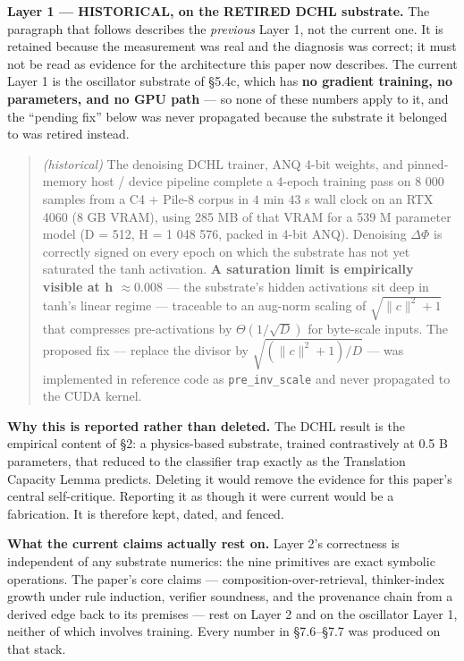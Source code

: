 \documentclass[
  11pt,
  a4paper,
]{article}
\begin{document}
\textbf{Layer 1 --- HISTORICAL, on the RETIRED DCHL substrate.} The
paragraph that follows describes the \emph{previous} Layer 1, not the
current one. It is retained because the measurement was real and the
diagnosis was correct; it must not be read as evidence for the
architecture this paper now describes. The current Layer 1 is the
oscillator substrate of §5.4c, which has \textbf{no gradient training,
no parameters, and no GPU path} --- so none of these numbers apply to
it, and the ``pending fix'' below was never propagated because the
substrate it belonged to was retired instead.

\begin{quote}
\emph{(historical)} The denoising DCHL trainer, ANQ 4-bit weights, and
pinned-memory host / device pipeline complete a 4-epoch training pass on
8 000 samples from a C4 + Pile-8 corpus in \(4\) min \(43\) s wall clock
on an RTX 4060 (8 GB VRAM), using 285 MB of that VRAM for a 539 M
parameter model (D = 512, H = 1 048 576, packed in 4-bit ANQ). Denoising
\(\Delta\Phi\) is correctly signed on every epoch on which the substrate
has not yet saturated the tanh activation. \textbf{A saturation limit is
empirically visible at \textbar h\textbar{} \(\approx 0.008\)} --- the
substrate's hidden activations sit deep in tanh's linear regime ---
traceable to an aug-norm scaling of \(\sqrt{\lVert c\rVert^2 + 1}\) that
compresses pre-activations by \(\Theta(1/\sqrt{D})\) for byte-scale
inputs. The proposed fix --- replace the divisor by
\(\sqrt{(\lVert c\rVert^2 + 1)/D}\) --- was implemented in reference
code as \texttt{pre\_inv\_scale} and never propagated to the CUDA
kernel.
\end{quote}

\textbf{Why this is reported rather than deleted.} The DCHL result is
the empirical content of §2: a physics-based substrate, trained
contrastively at 0.5 B parameters, that reduced to the classifier trap
exactly as the Translation Capacity Lemma predicts. Deleting it would
remove the evidence for this paper's central self-critique. Reporting it
as though it were current would be a fabrication. It is therefore kept,
dated, and fenced.

\textbf{What the current claims actually rest on.} Layer 2's correctness
is independent of any substrate numerics: the nine primitives are exact
symbolic operations. The paper's core claims ---
composition-over-retrieval, thinker-index growth under rule induction,
verifier soundness, and the provenance chain from a derived edge back to
its premises --- rest on Layer 2 and on the oscillator Layer 1, neither
of which involves training. Every number in §7.6--§7.7 was produced on
that stack.
\end{document}
